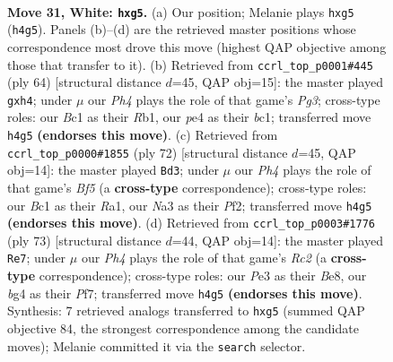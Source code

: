 \documentclass[11pt]{article}
\begin{document}
\clearpage

\begin{figure}[p]\centering
\begin{subfigure}{0.46\textwidth}\centering
\resizebox{\linewidth}{!}{%
\newchessgame
\chessboard[
  setfen={1r6/pp4k1/8/2pr2p1/4p1bP/N3P3/PP3K2/R1B5 w - - 0 31},
  showmover=false,
  pgfstyle=straightmove, color=movearrow, markmove={h4-g5}
]}
\caption{}
\end{subfigure}\hfill
\begin{subfigure}{0.46\textwidth}\centering
\resizebox{\linewidth}{!}{%
\newchessgame
\chessboard[
  setfen={8/2r2p2/1p3k1p/8/1p5p/3B1KP1/PP3P2/1Rb5 w - - 0 33},
  showmover=false,
  pgfstyle=straightmove, color=movearrow, markmove={g3-h4}
]}
\caption{}
\end{subfigure}
\\[4pt]
\begin{subfigure}{0.46\textwidth}\centering
\resizebox{\linewidth}{!}{%
\newchessgame
\chessboard[
  setfen={6k1/4rp2/2r3pp/P4B2/3p4/7P/2P2PP1/R5K1 w - - 0 37},
  showmover=false,
  pgfstyle=straightmove, color=movearrow, markmove={f5-d3}
]}
\caption{}
\end{subfigure}\hfill
\begin{subfigure}{0.46\textwidth}\centering
\resizebox{\linewidth}{!}{%
\newchessgame
\chessboard[
  setfen={4bk2/p1r2p2/7p/R1Pp4/5P2/2PB4/2P2K2/8 b - - 2 37},
  showmover=false,
  pgfstyle=straightmove, color=movearrow, markmove={c7-e7}
]}
\caption{}
\end{subfigure}
\caption{\textbf{Move 31, White: \texttt{hxg5}.} (a) Our position; Melanie plays \texttt{hxg5} (\texttt{h4g5}). Panels (b)--(d) are the retrieved master positions whose correspondence most drove this move (highest QAP objective among those that transfer to it). (b) Retrieved from \texttt{ccrl\_top\_p0001\#445} (ply 64) [structural distance $d$=45, QAP obj=15]: the master played \texttt{gxh4}; under $\mu$ our \emph{Ph4} plays the role of that game's \emph{Pg3}; cross-type roles: our \emph{B}c1 as their \emph{R}b1, our \emph{p}e4 as their \emph{b}c1; transferred move \texttt{h4g5} \textbf{(endorses this move)}. (c) Retrieved from \texttt{ccrl\_top\_p0000\#1855} (ply 72) [structural distance $d$=45, QAP obj=14]: the master played \texttt{Bd3}; under $\mu$ our \emph{Ph4} plays the role of that game's \emph{Bf5} (a \textbf{cross-type} correspondence); cross-type roles: our \emph{B}c1 as their \emph{R}a1, our \emph{N}a3 as their \emph{P}f2; transferred move \texttt{h4g5} \textbf{(endorses this move)}. (d) Retrieved from \texttt{ccrl\_top\_p0003\#1776} (ply 73) [structural distance $d$=44, QAP obj=14]: the master played \texttt{Re7}; under $\mu$ our \emph{Ph4} plays the role of that game's \emph{Rc2} (a \textbf{cross-type} correspondence); cross-type roles: our \emph{P}e3 as their \emph{B}e8, our \emph{b}g4 as their \emph{P}f7; transferred move \texttt{h4g5} \textbf{(endorses this move)}. Synthesis: 7 retrieved analogs transferred to \texttt{hxg5} (summed QAP objective 84, the strongest correspondence among the candidate moves); Melanie committed it via the \texttt{search} selector.}
\label{fig:thought-m60}
\end{figure}
\end{document}
